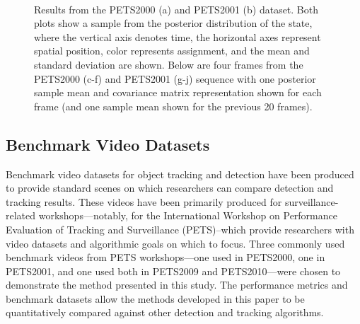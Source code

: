 \documentclass{article}
\begin{document}
\begin{figure}[!]
   \\
  \caption{Results from the PETS2000 (a) and PETS2001 (b) dataset. Both plots show a sample from the posterior distribution of the state, where the vertical axis denotes time, the horizontal axes represent spatial position, color represents assignment, and the mean and standard deviation are shown. Below are four frames from the PETS2000 (c-f) and PETS2001 (g-j) sequence with one posterior sample mean and covariance matrix representation shown for each frame (and one sample mean shown for the previous 20 frames).}
  \label{fig:pets2001_overlay}
\end{figure}


\subsection{Benchmark Video Datasets}
\label{sec:benchmarkvideodatasets}

Benchmark video datasets for object tracking and detection have been produced to provide standard scenes on which researchers can compare detection and tracking results. These videos have been primarily produced for surveillance-related workshops---notably, for the International Workshop on Performance Evaluation of Tracking and Surveillance (PETS)--which provide researchers with video datasets and algorithmic goals on which to focus. Three commonly used benchmark videos from PETS workshops---one used in PETS2000, one in PETS2001, and one used both in PETS2009 and PETS2010---were chosen to demonstrate the method presented in this study. The performance metrics and benchmark datasets allow the methods developed in this paper to be quantitatively compared against other detection and tracking algorithms.
\end{document}
